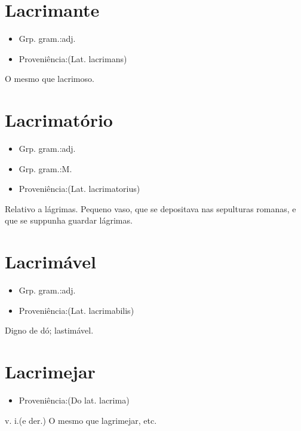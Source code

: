\section{Lacrimante}
\begin{itemize}
\item {Grp. gram.:adj.}
\end{itemize}
\begin{itemize}
\item {Proveniência:(Lat. \textunderscore lacrimans\textunderscore )}
\end{itemize}
O mesmo que \textunderscore lacrimoso\textunderscore .
\section{Lacrimatório}
\begin{itemize}
\item {Grp. gram.:adj.}
\end{itemize}
\begin{itemize}
\item {Grp. gram.:M.}
\end{itemize}
\begin{itemize}
\item {Proveniência:(Lat. \textunderscore lacrimatorius\textunderscore )}
\end{itemize}
Relativo a lágrimas.
Pequeno vaso, que se depositava nas sepulturas romanas, e que se suppunha guardar lágrimas.
\section{Lacrimável}
\begin{itemize}
\item {Grp. gram.:adj.}
\end{itemize}
\begin{itemize}
\item {Proveniência:(Lat. \textunderscore lacrimabilis\textunderscore )}
\end{itemize}
Digno de dó; lastimável.
\section{Lacrimejar}
\begin{itemize}
\item {Proveniência:(Do lat. \textunderscore lacrima\textunderscore )}
\end{itemize}
\textunderscore v. i.\textunderscore  (e der.)
O mesmo que \textunderscore lagrimejar\textunderscore , etc.
